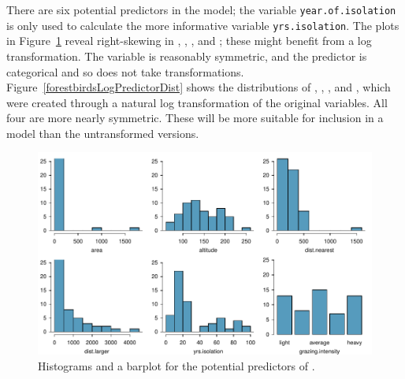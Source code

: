 There are six potential predictors in the model; the variable \texttt{year.of.isolation} is only used to calculate the more informative variable \texttt{yrs.isolation}. The plots in Figure~\ref{forestbirdsPredictorDist} reveal right-skewing in , , , and ; these might benefit from a log transformation. The variable  is reasonably symmetric, and the predictor  is categorical and so does not take transformations. Figure~\ref{forestbirdsLogPredictorDist} shows the distributions of , , , and , which were created through a natural log transformation of the original variables. All four are more nearly symmetric. These will be more suitable for inclusion in a model than the untransformed versions.

\begin{figure}[h!]
	\centering
	\includegraphics[width=\textwidth]
	{ch_multiple_linear_regression_oi_biostat/figures/forestbirdsPredictorDist/forestbirdsPredictorDist.pdf}
    \caption{Histograms and a barplot for the potential predictors of .}
   	\label{forestbirdsPredictorDist}
\end{figure}

\textD{\newpage}

